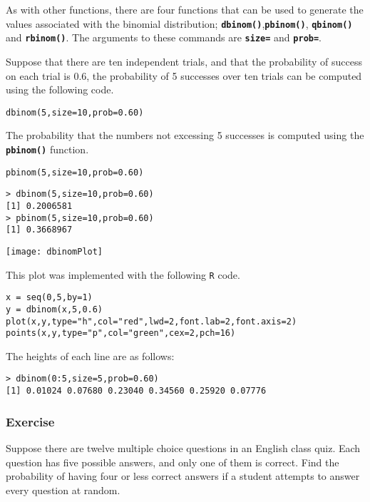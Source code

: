 As with other functions, there are four functions that can be used to generate the values associated with the binomial distribution; \textbf{\texttt{dbinom()}},\textbf{\texttt{pbinom()}}, \textbf{\texttt{qbinom()}} and \textbf{\texttt{rbinom()}}.
The arguments to these commands are \texttt{\textbf{size=}} and \texttt{\textbf{prob=}}.

Suppose that there are ten independent trials, and that the probability of success on each trial is 0.6, the probability of 5 successes over ten trials can be computed using the following code.
\begin{framed}
\begin{verbatim}
dbinom(5,size=10,prob=0.60)
\end{verbatim}
\end{framed}
The probability that the numbers not excessing 5 successes is computed using the \textbf{\texttt{pbinom()}} function.
\begin{framed}
\begin{verbatim}
pbinom(5,size=10,prob=0.60)
\end{verbatim}
\end{framed}

\begin{verbatim}
> dbinom(5,size=10,prob=0.60)
[1] 0.2006581
> pbinom(5,size=10,prob=0.60)
[1] 0.3668967
\end{verbatim}

 \begin{center}
 \texttt{[image: dbinomPlot]}
 \end{center}
 
This plot was implemented with the following \texttt{R} code.
\begin{framed}
\begin{verbatim}
x = seq(0,5,by=1)
y = dbinom(x,5,0.6)
plot(x,y,type="h",col="red",lwd=2,font.lab=2,font.axis=2)
points(x,y,type="p",col="green",cex=2,pch=16)
\end{verbatim}
\end{framed}
The heights of each line are as follows:
\begin{verbatim}
> dbinom(0:5,size=5,prob=0.60)
[1] 0.01024 0.07680 0.23040 0.34560 0.25920 0.07776
\end{verbatim}

\subsubsection{Exercise}
Suppose there are twelve multiple choice questions in an English class quiz. Each question has five possible answers, and only one of them is correct. Find the probability of having four or less correct answers if a student attempts to answer every question at random. 

